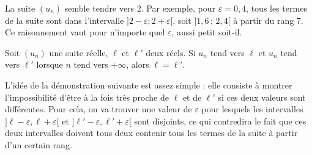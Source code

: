 \documentclass[11pt,fleqn]{book} %
\begin{document}
La suite $(u_n)$ semble tendre vers 2. Par exemple, pour $\varepsilon = 0,4$, tous les termes de la suite sont dans l'intervalle $]2-\varepsilon ; 2+\varepsilon[$, soit $]1,6\,;\, 2,4[$ à partir du rang 7. Ce raisonnement vaut pour n'importe quel $\varepsilon$, aussi petit soit-il.


\begin{proposition}
Soit $(u_n)$ une suite réelle, $\ell$ et $\ell'$ deux réels. Si $u_n$ tend vers $\ell$ et $u_n$ tend vers $\ell'$ lorsque $n$ tend vers $+\infty$, alors $\ell=\ell'$.\end{proposition}

L'idée de la démonstration suivante est assez simple : elle consiste à montrer l'impossibilité d'être à la fois très proche de $\ell$ et de $\ell'$ si ces deux valeurs sont différentes. Pour cela, on va trouver une valeur de $\varepsilon$ pour lesquels les intervalles $] \ell- \varepsilon, \ell+\varepsilon [$ et $] \ell'- \varepsilon, \ell'+\varepsilon [$ sont disjoints, ce qui contredira le fait que ces deux intervalles doivent tous deux contenir tous les termes de la suite à partir d'un certain rang.

\begin{center}
\end{center}
\end{document}
